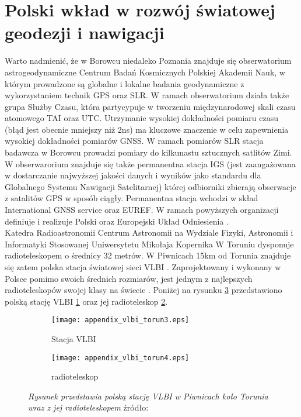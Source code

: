 \section{Polski wkład w rozwój światowej geodezji i nawigacji}
\noindent Warto nadmienić, że w Borowcu niedaleko Poznania znajduje się obserwatorium astrogeodynamiczne Centrum Badań Kosmicznych Polskiej Akademii Nauk, 
w którym prowadzone są globalne i lokalne badania geodynamiczne z wykorzystaniem technik GPS oraz SLR.
W ramach obserwatorium działa także grupa Służby Czasu, która partycypuje w tworzeniu międzynarodowej skali czasu atomowego TAI oraz UTC.
Utrzymanie wysokiej dokładności pomiaru czasu (błąd jest obecnie mniejszy niż 2ns) ma kluczowe znaczenie w celu zapewnienia 
wysokiej dokładności pomiarów GNSS. \cite[][zakładka: infomracje ogólne]{BOROWIEC}
\indent W ramach pomiarów SLR stacja badawcza w Borowcu prowadzi pomiary do kilkunastu sztucznych satlitów Zimi. 
W obserwarorium znajduje się także permanentna stacja IGS (jest zaangażowana w dostarczanie najwyższej jakości danych i wyników jako standardu dla Globalnego Systemu Nawigacji Satelitarnej) której odbiorniki zbierają obserwacje z satalitów GPS w sposób ciągły.
Permanentna stacja wchodzi w skład International GNSS service oraz EUREF. W ramach powyższych organizacji definiuje i realizuje Polski oraz Europejski Układ Odniesienia
\cite[][zakładka: Stacja IGS]{BOROWIEC}.\\
\indent Katedra Radioastronomii Centrum Astronomii na Wydziale Fizyki, Astronomii i Informatyki Stosowanej Uniwersytetu Mikołaja Kopernika W Toruniu dysponuje 
radioteleskopem o średnicy 32 metrów. W Piwnicach 15km od Torunia znajduje się zatem polska stacja światowej sieci VLBI \cite[]{vlbi_torun_katedra}. Zaprojektowany i wykonany w Polsce pomimo swoich średnich rozmiarów, jest jednym z najlepszych radioteleskopów swojej klasy na świecie \cite[]{vlbi_torun_tele}.
Poniżej na rysunku \ref{fig:torun_both} przedstawiono polską stację VLBI \ref{fig:torun_station} oraz jej radioteleskop \ref{fig:torun_teleskop}.
\begin{figure}[H]
\centering
\begin{subfigure}{.5\textwidth}
  \centering
  \texttt{[image: appendix\_vlbi\_torun3.eps]}
  \caption{Stacja VLBI}
  \label{fig:torun_station}
\end{subfigure}%
\begin{subfigure}{.5\textwidth}
  \centering
  \texttt{[image: appendix\_vlbi\_torun4.eps]}
  \caption{radioteleskop}
  \label{fig:torun_teleskop}
\end{subfigure}
\caption{\textit{Rysunek przedstawia polską stację VLBI w Piwnicach koło Torunia wraz z jej radioteleskopem}
źródło: \cite[]{vlbi_torun_katedra}}
\label{fig:torun_both}
\end{figure}
